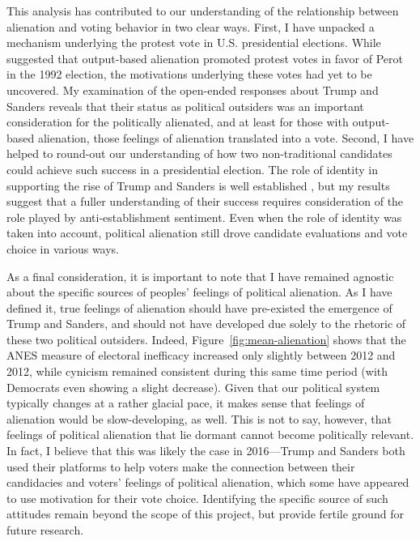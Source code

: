 \documentclass[12pt]{article}
\begin{document}
This analysis has contributed to our understanding of the relationship between alienation and voting behavior in two clear ways. First, I have unpacked a mechanism underlying the protest vote in U.S. presidential elections. While \textcite{southwell1998electoral} suggested that output-based alienation promoted protest votes in favor of Perot in the 1992 election, the motivations underlying these votes had yet to be uncovered. My examination of the open-ended responses about Trump and Sanders reveals that their status as political outsiders was an important consideration for the politically alienated, and at least for those with output-based alienation, those feelings of alienation translated into a vote. Second, I have helped to round-out our understanding of how two non-traditional candidates could achieve such success in a presidential election. The role of identity in supporting the rise of Trump and Sanders is well established \parencite[e.g.,][]{sides2018identity,mason2021activating}, but my results suggest that a fuller understanding of their success requires consideration of the role played by anti-establishment sentiment. Even when the role of identity was taken into account, political alienation still drove candidate evaluations and vote choice in various ways. 

As a final consideration, it is important to note that I have remained agnostic about the specific sources of peoples' feelings of political alienation. As I have defined it, true feelings of alienation should have pre-existed the emergence of Trump and Sanders, and should not have developed due solely to the rhetoric of these two political outsiders. Indeed, Figure~\ref{fig:mean-alienation} shows that the ANES measure of electoral inefficacy increased only slightly between 2012 and 2012, while cynicism remained consistent during this same time period (with Democrats even showing a slight decrease). Given that our political system typically changes at a rather glacial pace, it makes sense that feelings of alienation would be slow-developing, as well. This is not to say, however, that feelings of political alienation that lie dormant cannot become politically relevant. In fact, I believe that this was likely the case in 2016---Trump and Sanders both used their platforms to help voters make the connection between their candidacies and voters' feelings of political alienation, which some have appeared to use motivation for their vote choice. Identifying the specific source of such attitudes remain beyond the scope of this project, but provide fertile ground for future research. 
\end{document}
